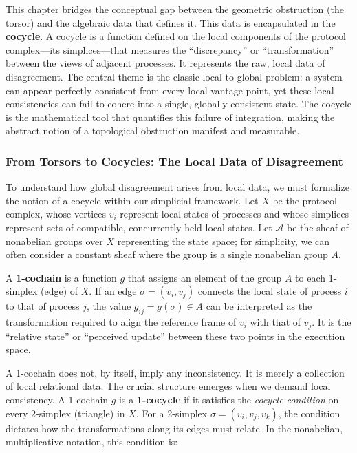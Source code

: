 \documentclass[
]{article}
\begin{document}
This chapter bridges the conceptual gap between the geometric
obstruction (the torsor) and the algebraic data that defines it. This
data is encapsulated in the \textbf{cocycle}. A cocycle is a function
defined on the local components of the protocol complex---its
simplices---that measures the ``discrepancy'' or ``transformation''
between the views of adjacent processes. It represents the raw, local
data of disagreement. The central theme is the classic local-to-global
problem: a system can appear perfectly consistent from every local
vantage point, yet these local consistencies can fail to cohere into a
single, globally consistent state. The cocycle is the mathematical tool
that quantifies this failure of integration, making the abstract notion
of a topological obstruction manifest and measurable.

\subsubsection{From Torsors to Cocycles: The Local Data of
Disagreement}\label{from-torsors-to-cocycles-the-local-data-of-disagreement}

To understand how global disagreement arises from local data, we must
formalize the notion of a cocycle within our simplicial framework. Let
\(X\) be the protocol complex, whose vertices \(v_i\) represent local
states of processes and whose simplices represent sets of compatible,
concurrently held local states. Let \(\mathcal{A}\) be the sheaf of
nonabelian groups over \(X\) representing the state space; for
simplicity, we can often consider a constant sheaf where the group is a
single nonabelian group \(A\).

A \textbf{1-cochain} is a function \(g\) that assigns an element of the
group \(A\) to each 1-simplex (edge) of \(X\). If an edge
\(\sigma = (v_i, v_j)\) connects the local state of process \(i\) to
that of process \(j\), the value \(g_{ij} = g(\sigma) \in A\) can be
interpreted as the transformation required to align the reference frame
of \(v_i\) with that of \(v_j\). It is the ``relative state'' or
``perceived update'' between these two points in the execution space.

A 1-cochain does not, by itself, imply any inconsistency. It is merely a
collection of local relational data. The crucial structure emerges when
we demand local consistency. A 1-cochain \(g\) is a \textbf{1-cocycle}
if it satisfies the \emph{cocycle condition} on every 2-simplex
(triangle) in \(X\). For a 2-simplex \(\sigma = (v_i, v_j, v_k)\), the
condition dictates how the transformations along its edges must relate.
In the nonabelian, multiplicative notation, this condition is:
\end{document}
